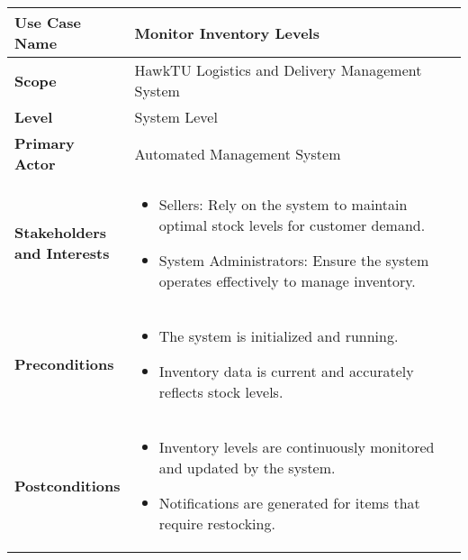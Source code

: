 \documentclass{article}
\begin{document}
\begin{longtable}{|>{\raggedright\arraybackslash}m{0.25\linewidth}|m{0.75\linewidth}|}
\hline
\textbf{Use Case Name} & Monitor Inventory Levels \\
\hline
\textbf{Scope} & HawkTU Logistics and Delivery Management System \\
\hline
\textbf{Level} & System Level \\
\hline
\textbf{Primary Actor} & Automated Management System \\
\hline
\textbf{Stakeholders and Interests} & 
\begin{itemize}
    \item Sellers: Rely on the system to maintain optimal stock levels for customer demand.
    \item System Administrators: Ensure the system operates effectively to manage inventory.
\end{itemize} \\
\hline
\textbf{Preconditions} & 
\begin{itemize}
    \item The system is initialized and running.
    \item Inventory data is current and accurately reflects stock levels.
\end{itemize} \\
\hline
\textbf{Postconditions} & 
\begin{itemize}
    \item Inventory levels are continuously monitored and updated by the system.
    \item Notifications are generated for items that require restocking.
\end{itemize} \\
\hline
\end{longtable}

\vspace{-2.45em}
\end{document}
